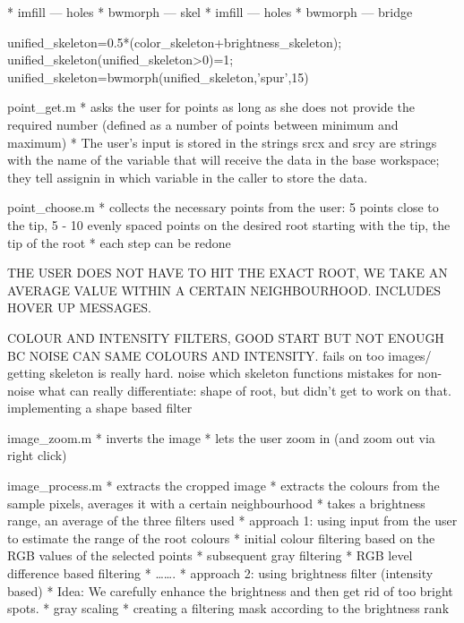 * imfill — holes
* bwmorph — skel
* imfill — holes
* bwmorph — bridge

unified_skeleton=0.5*(color_skeleton+brightness_skeleton);
unified_skeleton(unified_skeleton>0)=1;
unified_skeleton=bwmorph(unified_skeleton,'spur',15) %


point_get.m
* asks the user for points as long as she does not provide the required number (defined as a number of points between minimum and maximum)
* The user’s input is stored in the strings srcx and srcy are strings with the name of the variable that will receive the data in the base workspace; they tell assignin in which variable in the caller to store the data.


point_choose.m
* collects the necessary points from the user: 5 points  close to the tip, 5 - 10 evenly spaced points on the desired root starting with the tip, the tip of the root
* each step can be redone


THE USER DOES NOT HAVE TO HIT THE EXACT ROOT, WE TAKE AN AVERAGE VALUE WITHIN A CERTAIN NEIGHBOURHOOD.
INCLUDES HOVER UP MESSAGES. 

COLOUR AND INTENSITY FILTERS, GOOD START BUT NOT ENOUGH BC NOISE CAN SAME COLOURS AND INTENSITY.
fails on too images/ getting skeleton is really hard.
noise which skeleton functions mistakes for non-noise
what can really differentiate: shape of root, but didn’t get to work on that.
implementing a shape based filter

image_zoom.m
* inverts the image 
* lets the user zoom in (and zoom out via right click)

image_process.m
* extracts the cropped image 
* extracts the colours from the sample pixels, averages it with a certain neighbourhood
* takes a brightness range, an average of the three filters used 
* approach 1: using input from the user to estimate the range of the root colours
* initial colour filtering based on the RGB values of the selected points
* subsequent gray filtering
* RGB level difference based filtering
* …….
* approach 2: using brightness filter (intensity based)
* Idea: We carefully enhance the brightness and then get rid of too bright spots.
* gray scaling
* creating a filtering mask according to the brightness rank

